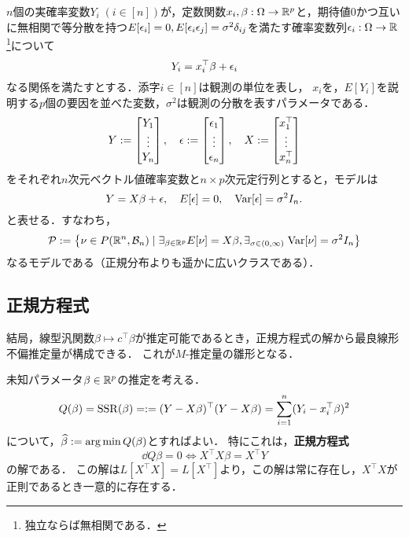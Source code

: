 \documentclass[uplatex,dvipdfmx]{jsreport}
\begin{document}
\begin{notation}
    $n$個の実確率変数$Y_i\;(i\in[n])$が，定数関数$x_i,\beta:\Omega\to\mathbb{R}^p$と，期待値$0$かつ互いに無相関で等分散を持つ$E[\epsilon_i]=0,E[\epsilon_i\epsilon_j]=\sigma^2\delta_{ij}$を満たす確率変数列$\epsilon_i:\Omega\to\mathbb{R}$\footnote{独立ならば無相関である．}について
    \[Y_i=x_i^\top\beta+\epsilon_i\]
    なる関係を満たすとする．添字$i\in[n]$は観測の単位を表し，
    $x_i$を，$E[Y_i]$を説明する$p$個の要因を並べた変数，$\sigma^2$は観測の分散を表すパラメータである．
    \[Y:=\begin{bmatrix}Y_1\\\vdots\\Y_n\end{bmatrix},\quad\epsilon:=\begin{bmatrix}\epsilon_1\\\vdots\\\epsilon_n\end{bmatrix},\quad X:=\begin{bmatrix}x^\top_1\\\vdots\\x^\top_n\end{bmatrix}\]
    をそれぞれ$n$次元ベクトル値確率変数と$n\times p$次元定行列とすると，モデルは
    \[Y=X\beta+\epsilon,\quad E[\epsilon]=0,\quad\mathrm{Var}[\epsilon]=\sigma^2I_n.\]
    と表せる．すなわち，
    \[\mathcal{P}:=\left\{\nu\in P(\mathbb{R}^n,\mathcal{B}_n)\mid\exists_{\beta\in\mathbb{R}^p} E[\nu]=X\beta,\exists_{\sigma\in(0,\infty)}\;\mathrm{Var}[\nu]=\sigma^2I_n\right\}\]
    なるモデルである（正規分布よりも遥かに広いクラスである）．
\end{notation}

\subsection{正規方程式}

\begin{tcolorbox}[colframe=ForestGreen, colback=ForestGreen!10!white,breakable,colbacktitle=ForestGreen!40!white,coltitle=black,fonttitle=\bfseries\sffamily,
title=]
    結局，線型汎関数$\beta\mapsto c^\top\beta$が推定可能であるとき，正規方程式の解から最良線形不偏推定量が構成できる．
    これが$M$-推定量の雛形となる．
\end{tcolorbox}

\begin{definition}
    未知パラメータ$\beta\in\mathbb{R}^p$の推定を考える．
    \[Q(\beta)=\mathrm{SSR}(\beta)=:=(Y-X\beta)^\top(Y-X\beta)=\sum^n_{i=1}(Y_i-x_i^\top\beta)^2\]
    について，$\widehat{\beta}:=\operatorname*{arg\,min} Q(\beta)$とすればよい．
    特にこれは，\textbf{正規方程式}
    \[\dd{Q}{\beta}=0\Leftrightarrow X^\top X\beta=X^\top Y\]
    の解である．
    この解は$L[X^\top X]=L[X^\top]$より，この解は常に存在し，$X^\top X$が正則であるとき一意的に存在する．
\end{definition}
\end{document}
